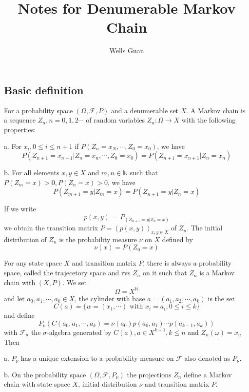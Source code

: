 \documentclass[lang=en, color=blue, ]{elegantbook}
\title{Notes for Denumerable Markov Chain}
\author{Wells Guan}
\newcommand{\F}{\mathcal{F}}
\newcommand{\N}{\mathbb{N}}
\begin{document}


\chapter{}

\section{Basic definition}

\begin{definition}
    For a probability space $(\Omega, \F, P)$ and a denumerable set $X$. A Markov chain is a sequence $Z_n, n = 0,1,2\cdots$ of random variables $Z_n:\Omega \to X$ with the following properties:\par
    a. For $x_i, 0\leq i \leq n+1$ if $P(Z_n = x_N,\cdots,Z_0 = x_0)$, we have
    \[P(Z_{n+1} = x_{n+1}|Z_n = x_n,\cdots, Z_0 = x_0) = P(Z_{n+1} = x_{n+1}|Z_n = x_n)\]\par
    b. For all elements $x,y \in X$ and $m,n\in \N$ such that $P(Z_m = x) > 0, P(Z_n = x) > 0$, we have
    \[P(Z_{m+1} = y|Z_m = x) = P(Z_{n+1} = y|Z_n = x)\]\par
    If we write
    \[p(x,y)\ = P_(Z_{n+1} = y|Z_n = x)\]
    we obtain the transition matrix $P = (p(x,y))_{x,y \in X}$ of $Z_n$. The initial distribution of $Z_n$ is the probability measure $\nu$ on $X$ defined by
    \[\nu(x) = P(Z_0 = x)\]
\end{definition}

\begin{theorem}
    For any state space $X$ and transition matrix $P$, there is always a probability space, called the trajecetory space and rvs $Z_n$ on it such that $Z_n$ is a Markov chain with $(X,P)$. We set
    \[
    \Omega = X^{\N}
    \]
    and let $a_0,a_1,\cdots,a_k \in X$, the cylinder with base $a = (a_1,a_2,\cdots,a_k)$ is the set
    \[
    C(a) = \{w = (x_1,\cdots)\text{ with }x_i = a_i, 0\leq i \leq k\}
    \]
    and define
    \[
    P_{\nu}(C(a_0,a_1,\cdots,a_k) = \nu(a_0)p(a_0,a_1)\cdots p(a_{k-1},a_k))
    \]
    with $\F_n$ the $\sigma$-algebra generated by $C(a), a\in X^{k+1}, k\leq n$ and $Z_n(\omega) = x_n$
    Then\par
    a. $P_{\nu}$ has a unique extension to a probability measure on $\F$ also denoted as $P_{\nu}$.\par
    b. On the probability space $(\Omega, \F, P_{\nu})$ the projections $Z_n$ define a Markov chain with state space $X$, initial distribution $\nu$ and transition matrix $P$.
\end{theorem}
 
\end{document}

